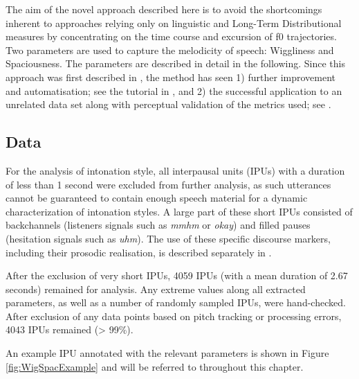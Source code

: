 The aim of the novel approach described here is to avoid the shortcomings inherent to approaches relying only on linguistic and Long-Term Distributional measures by concentrating on the time course and excursion of f0 trajectories. Two parameters are used to capture the melodicity of speech: Wiggliness and Spaciousness. The parameters are described in detail in the following. Since this approach was first described in \citet{wehrleSomewhereSpectrumRobotic2018}, the method has seen 1) further improvement and automatisation; see the tutorial in \citet{wehrleBriefTutorialUsing2022}, and 2) the successful application to an unrelated data set along with perceptual validation of the metrics used; see \citet{wehrleEvaluatingProsodicAspects2023}. 

	\subsection{Data}\label{intonation_analysis_data}

For the analysis of intonation style, all interpausal units (IPUs) with a duration of less than 1 second were excluded from further analysis, as such utterances cannot be guaranteed to contain enough speech material for a dynamic characterization of intonation styles. A large part of these short IPUs consisted of backchannels (listeners signals such as \emph{mmhm} or \emph{okay}) and filled pauses (hesitation signals such as \emph{uhm}). The use of these specific discourse markers, including their prosodic realisation, is described separately in .

After the exclusion of very short IPUs, 4059 IPUs (with a mean duration of 2.67 seconds) remained for analysis. Any extreme values along all extracted parameters, as well as a number of randomly sampled IPUs, were hand-checked. After exclusion of any data points based on pitch tracking or processing errors, 4043 IPUs remained (\textgreater{} 99\%).

An example IPU annotated with the relevant parameters is shown in Figure \ref{fig:WigSpacExample} and will be referred to throughout this chapter.




